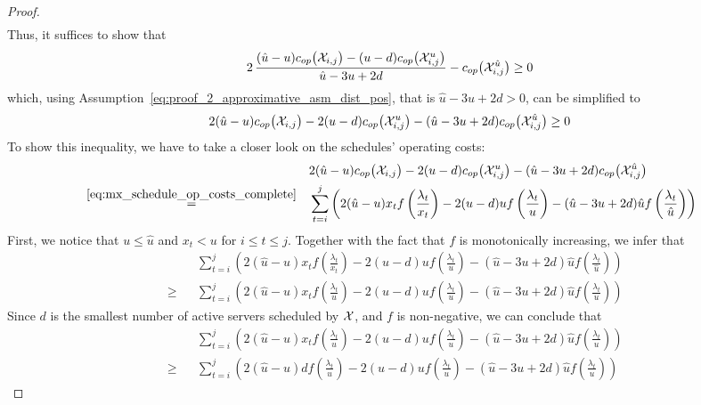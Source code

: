 \begin{proof}
\begin{align*}
\end{align*}
Thus, it suffices to show that
\begin{align*}
	2\,\frac{(\hat{u}-u)c_{op}\bigl(\mathcal{X}_{i,j}\bigr)-(u-d)c_{op}\bigl(\mathcal{X}_{i,j}^u\bigr)}{\hat{u}-3u+2d}-c_{op}\bigl(\mathcal{X}_{i,j}^{\hat{u}}\bigr)\ge 0
\end{align*}
which, using Assumption~\eqref{eq:proof_2_approximative_asm_dist_pos}, that is $\hat{u}-3u+2d>0$, can be simplified to
\begin{equation*}
	2(\hat{u}-u)c_{op}\bigl(\mathcal{X}_{i,j}\bigr)-2(u-d)c_{op}\bigl(\mathcal{X}_{i,j}^u\bigr)-(\hat{u}-3u+2d)c_{op}\bigl(\mathcal{X}_{i,j}^{\hat{u}}\bigr)\ge 0
\end{equation*}
To show this inequality, we have to take a closer look on the schedules' operating costs:
\begin{align*}
	&&&2(\hat{u}-u)c_{op}\bigl(\mathcal{X}_{i,j}\bigr)-2(u-d)c_{op}\bigl(\mathcal{X}_{i,j}^u\bigr)-(\hat{u}-3u+2d)c_{op}\bigl(\mathcal{X}_{i,j}^{\hat{u}}\bigr)\\
	&\stackrel{\eqref{eq:mx_schedule_op_costs_complete}}{=}&&\sum\limits_{t=i}^j\left(2(\hat{u}-u)x_tf\left(\frac{\lambda_t}{x_t}\right)-2(u-d)uf\left(\frac{\lambda_t}{u}\right)-(\hat{u}-3u+2d)\hat{u}f\left(\frac{\lambda_t}{\hat{u}}\right)\right)
\end{align*}
First, we notice that $u\le\hat{u}$ and $x_t<u$ for $i\le t\le j$. Together with the fact that $f$ is monotonically increasing, we infer that
\begin{align*}
	&&&\sum\limits_{t=i}^j\left(2(\hat{u}-u)x_tf\left(\frac{\lambda_t}{x_t}\right)-2(u-d)uf\left(\frac{\lambda_t}{u}\right)-(\hat{u}-3u+2d)\hat{u}f\left(\frac{\lambda_t}{\hat{u}}\right)\right)\\
	&\ge&&\sum\limits_{t=i}^j\left(2(\hat{u}-u)x_tf\left(\frac{\lambda_t}{u}\right)-2(u-d)uf\left(\frac{\lambda_t}{u}\right)-(\hat{u}-3u+2d)\hat{u}f\left(\frac{\lambda_t}{u}\right)\right)
\end{align*}
Since $d$ is the smallest number of active servers scheduled by $\mathcal{X}$, and $f$ is non-negative, we can conclude that
\begin{align*}
	&&&\sum\limits_{t=i}^j\left(2(\hat{u}-u)x_tf\left(\frac{\lambda_t}{u}\right)-2(u-d)uf\left(\frac{\lambda_t}{u}\right)-(\hat{u}-3u+2d)\hat{u}f\left(\frac{\lambda_t}{u}\right)\right)\\
	&\ge&&\sum\limits_{t=i}^j\left(2(\hat{u}-u)df\left(\frac{\lambda_t}{u}\right)-2(u-d)uf\left(\frac{\lambda_t}{u}\right)-(\hat{u}-3u+2d)\hat{u}f\left(\frac{\lambda_t}{u}\right)\right)
\end{align*}

\end{proof}
